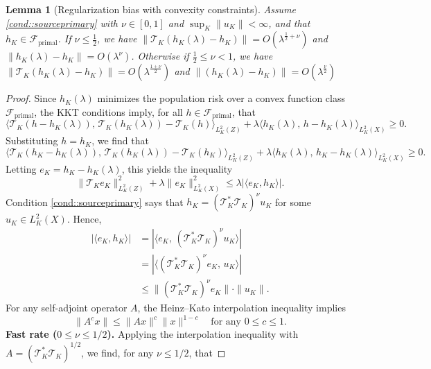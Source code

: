 \documentclass[11pt]{article}
\theoremstyle{plain}
\newtheorem{lemma}{Lemma}
\theoremstyle{definition}
\theoremstyle{remark}
\theoremstyle{definition}
\begin{document}
\begin{lemma}[Regularization bias with convexity constraints]
\label{lemma::regbiasconstrained}
    Assume  \ref{cond::sourceprimary} with $\nu \in [0,1]$ and  $\sup_K  \|   u_K \| < \infty$, and that $h_K \in \mathcal{F}_{\mathrm{primal}}$. If $\nu \leq \frac{1}{2}$,  we have $\|\mathcal{T}_K (h_K(\lambda) - h_K)\| = O(\lambda^{\frac{1}{2} + \nu})$ and $\|h_K(\lambda) - h_K\| = O(\lambda^{\nu})$. Otherwise if $\frac{1}{2} \leq \nu < 1$, we have $\|\mathcal{T}_K(h_K(\lambda) - h_K)\| = O(\lambda^{\frac{1 + \nu}{2} })$ and $\|(h_K(\lambda) - h_K)\| = O(\lambda^{\frac{\nu}{2}})$
    \end{lemma}
\begin{proof}
Since $h_K(\lambda)$ minimizes the population risk over a convex function class $\mathcal{F}_{\mathrm{primal}}$, the KKT conditions imply, for all $h \in \mathcal{F}_{\mathrm{primal}}$, that
\[
\langle \mathcal{T}_K(h - h_K(\lambda)),\, \mathcal{T}_K(h_K(\lambda)) - \mathcal{T}_K(h) \rangle_{L^2_K(Z)} + \lambda \langle h_K(\lambda),\, h - h_K(\lambda) \rangle_{L^2_K(X)} \geq 0.
\]
Substituting $h = h_K$, we find that
\[
\langle \mathcal{T}_K(h_K - h_K(\lambda)),\, \mathcal{T}_K(h_K(\lambda)) - \mathcal{T}_K(h_K) \rangle_{L^2_K(Z)} + \lambda \langle h_K(\lambda),\, h_K - h_K(\lambda) \rangle_{L^2_K(X)} \geq 0.
\]
Letting $e_K = h_K - h_K(\lambda)$, this yields the inequality
\begin{equation}
\|\mathcal{T}_K e_K\|_{L^2_K(Z)}^2 + \lambda \|e_K\|_{L^2_K(X)}^2 \leq \lambda \left| \langle e_K, h_K  \rangle \right|. \label{eqn::basicKKT}
\end{equation}
Condition \ref{cond::sourceprimary} says that  $h_K = (\mathcal{T}_K^* \mathcal{T}_K)^\nu u_K$ for some $u_K \in L^2_K(X)$. Hence,
\begin{align*}
\left| \langle e_K, h_K \rangle \right| 
&= \left| \langle e_K,\, (\mathcal{T}_K^* \mathcal{T}_K)^\nu u_K \rangle \right| \\
&= \left| \langle (\mathcal{T}_K^* \mathcal{T}_K)^\nu   e_K,\,u_K \rangle \right| \\
&\le \| (\mathcal{T}_K^* \mathcal{T}_K)^{\nu} e_K \| \cdot \|   u_K \|.
\end{align*}
For any self-adjoint operator $A$, the Heinz--Kato interpolation inequality \citep{steinerberger2019refined} implies
\[
\|A^c x\| \le \|A x\|^c \|x\|^{1-c} \quad \text{for any } 0 \leq c \leq 1.
\]
\newline \textbf{Fast rate ($0 \leq \nu \leq 1/2$).} Applying the interpolation inequality with $A = (\mathcal{T}_K^* \mathcal{T}_K)^{1/2}$, we find, for any $\nu \leq 1/2$, that

\end{proof}
\end{document}
